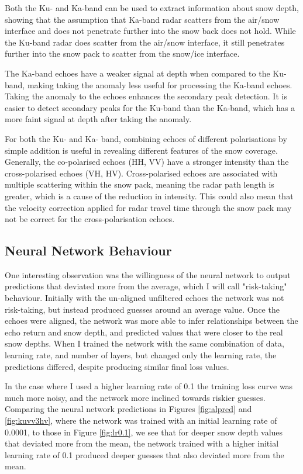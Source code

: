 \documentclass[11pt, a4paper]{article}
\begin{document}
Both the Ku- and Ka-band can be used to extract information about snow depth, showing that the assumption that Ka-band radar scatters from the air/snow interface and does not penetrate further into the snow back does not hold.  While the Ku-band radar does scatter from the air/snow interface,  it still penetrates further into the snow pack to scatter from the snow/ice interface.  

The Ka-band echoes have a weaker signal at depth when compared to the Ku-band, making taking the anomaly less useful for processing the Ka-band echoes. Taking the anomaly to the echoes enhances the secondary peak detection. It is easier to detect secondary peaks for the Ku-band than the Ka-band, which has a more faint signal at depth after taking the anomaly.

For both the Ku- and Ka- band, combining echoes of different polarisations by simple addition is useful in revealing different features of the snow coverage. Generally, the co-polarised echoes (HH, VV) have a stronger intensity than the cross-polarised echoes (VH, HV).  Cross-polarised echoes are associated with multiple scattering within the snow pack, meaning the radar path length is greater, which is a cause of the reduction in intensity.  This could also mean that the velocity correction applied for radar travel time through the snow pack may not be correct for the cross-polarisation echoes.

\subsection{Neural Network Behaviour}

One interesting observation was the willingness of the neural network to output predictions that deviated more from the average, which I will call "risk-taking" behaviour.  Initially with the un-aligned unfiltered echoes the network was not risk-taking, but instead produced guesses around an average value.  Once the echoes were aligned, the network was more able to infer relationships between the echo return and snow depth, and predicted values that were closer to the real snow depths. When I trained the network with the same combination of data, learning rate, and number of layers, but changed only the learning rate, the predictions differed, despite producing similar final loss values. 

In the case where I used a higher learning rate of 0.1 the training loss curve was much more noisy, and the network more inclined towards riskier guesses.  Comparing the neural network predictions in Figures \ref{fig:alpred} and \ref{fig:kuvv3hv}, where the network was trained with an initial learning rate of 0.0001, to those in Figure \ref{fig:lr0.1},  we see that for deeper snow depth values that deviated more from the mean, the network trained with a higher initial learning rate of 0.1 produced deeper guesses that also deviated more from the mean.
\end{document}
